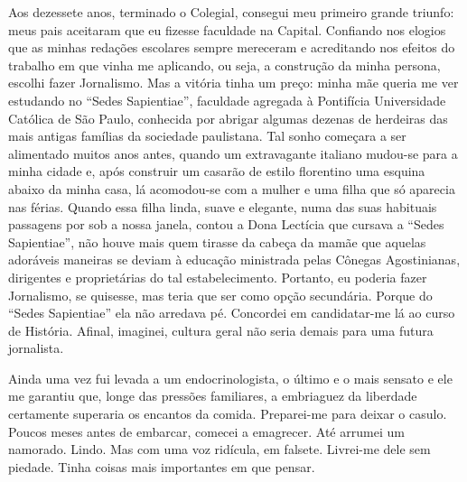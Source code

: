 Aos dezessete anos, terminado o Colegial, consegui meu primeiro grande triunfo: meus pais aceitaram que eu fizesse faculdade na Capital.
Confiando nos elogios que as minhas redações escolares sempre mereceram e acreditando nos efeitos do trabalho em que vinha me aplicando, ou seja, a construção da minha persona, escolhi fazer Jornalismo.
Mas a vitória tinha um preço: minha mãe queria me ver estudando no ``Sedes Sapientiae'', faculdade agregada à Pontifícia Universidade Católica de São Paulo, conhecida por abrigar algumas dezenas de herdeiras das mais antigas famílias da sociedade paulistana.
Tal sonho começara a ser alimentado muitos anos antes, quando um extravagante italiano mudou-se para a minha cidade e, após construir um casarão de estilo florentino uma esquina abaixo da minha casa, lá acomodou-se com a mulher e uma filha que só aparecia nas férias.
Quando essa filha linda, suave e elegante, numa das suas habituais passagens por sob a nossa janela, contou a Dona Lectícia que cursava a ``Sedes Sapientiae'', não houve mais quem tirasse da cabeça da mamãe que aquelas adoráveis maneiras se deviam à educação ministrada pelas Cônegas Agostinianas, dirigentes e proprietárias do tal estabelecimento.
Portanto, eu poderia fazer Jornalismo, se quisesse, mas teria que ser como opção secundária.
Porque do ``Sedes Sapientiae'' ela não arredava pé.
Concordei em candidatar-me lá ao curso de História.
Afinal, imaginei, cultura geral não seria demais para uma futura jornalista.

Ainda uma vez fui levada a um endocrinologista, o último e o mais sensato e ele me garantiu que, longe das pressões familiares, a embriaguez da liberdade certamente superaria os encantos da comida.
Preparei-me para deixar o casulo.
Poucos meses antes de embarcar, comecei a emagrecer.
Até arrumei um namorado.
Lindo.
Mas com uma voz ridícula, em falsete.
Livrei-me dele sem piedade.
Tinha coisas mais importantes em que pensar.
